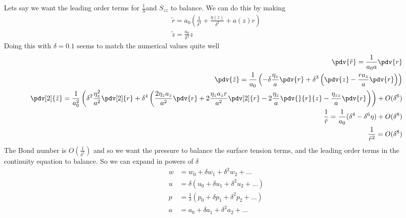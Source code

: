 \documentclass[12pt]{article}
\begin{document}
	Lets say we want the leading order terms for $\frac{1}{S} $and $S_{zz}$ to balance. We can do this by making
	\begin{align}
\tilde{r} = a_0\left(\frac{1}{\delta^4}+\frac{\eta(z)}{\delta^2}+a(z) r\right)\\
\tilde{z} = \frac{a_0}{\delta^3}z
	\end{align}
	Doing this with $\delta = 0.1$ seems to match the numerical values quite well
		\begin{align}
	\pdv{\tilde r } = \frac{1}{a_0a}\pdv{r}\\
	\pdv{\tilde z} = \frac{1}{a_0}\left(-\delta\frac{\eta_z}{a}\pdv{r}+\delta^3\left(\pdv{z}-\frac{ra_z}{a}\pdv{r}\right)\right)\\
	\pdv[2]{\tilde z}= \frac{1}{a_0^2}\left(\delta^2\frac{\eta_z^2}{a^2}\pdv[2]{r}+\delta^4\left(\frac{2\eta_za_z}{a^2}\pdv{r}+2\frac{\eta_za_zr}{a^2}\pdv[2]{r}-2\frac{\eta_z}{a}\pdv{}{r}{z}-\frac{\eta_{zz}}{a}\pdv{r}\right)\right) +O(\delta^6)\\
	\frac{1}{\tilde r} = \frac{1}{a_0}(\delta^4 -\delta^6\eta) +O(\delta^8)\\
	\frac{1}{\tilde r^2} = O(\delta^8)
	\end{align}
	The Bond number is $O(\frac{1}{\delta^5}) $ and so we want the pressure to balance the surface tension terms, and the leading order terms in the continuity equation to balance. So we can expand in powers of $\delta$
	\begin{align}
	w &= w_0+\delta w_1 +\delta^2 w_2+\dots\\
	u &= \delta(u_0+\delta u_1 +\delta^2 u_2+\dots )\\
	p &= \frac{1}{\delta}(p_0 + \delta p_1 +\delta^2 p_2 +\dots)\\
	a &= a_0 +\delta a_1 +\delta^2 a_2+\dots
	\end{align}
	
\end{document}
